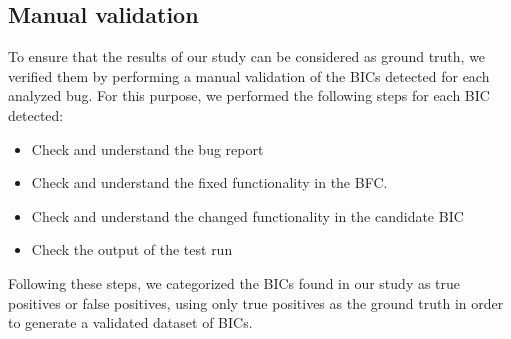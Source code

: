 

\subsection{Manual validation}
\label{subsec:manual}

To ensure that the results of our study can be considered as ground truth, we verified them by performing a manual validation of the BICs detected for each analyzed bug. For this purpose, we performed the following steps for each BIC detected:

\begin{itemize}
    \item Check and understand the bug report
    \item Check and understand the fixed functionality in the BFC.
    \item Check and understand the changed functionality in the candidate BIC
    \item Check the output of the test run
\end{itemize}

Following these steps, we categorized the BICs found in our study as true positives or false positives, using only true positives as the ground truth in order to generate a validated dataset of BICs.

